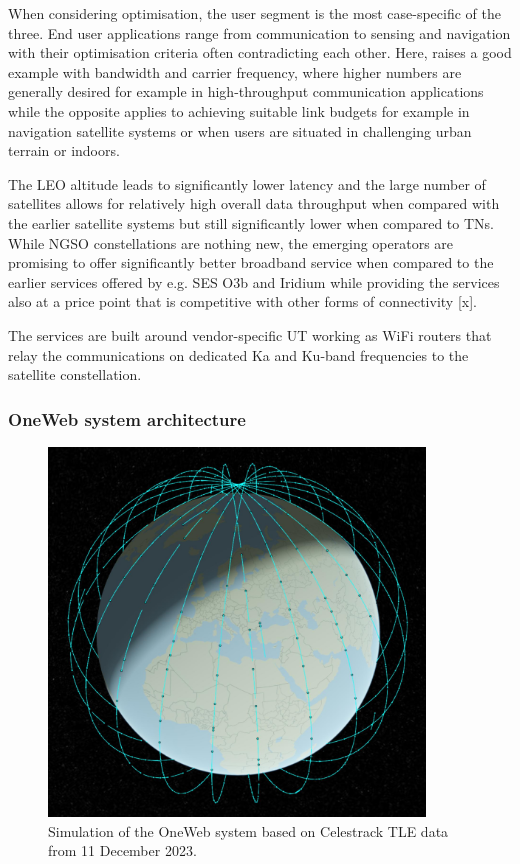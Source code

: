 \documentclass[english, 12pt, a4paper, elec, utf8, a-1b, online]{aaltothesis}
\begin{document}
When considering optimisation, the user segment is the most case-specific of the three.
End user applications range from communication to sensing and navigation with their optimisation criteria often contradicting each other.
Here, \cite{celikbilek2022survey} raises a good example with bandwidth and carrier frequency, where higher numbers are generally desired for example in high-throughput communication applications while the opposite applies to achieving suitable link budgets for example in navigation satellite systems or when users are situated in challenging urban terrain or indoors.

The LEO altitude leads to significantly lower latency and the large number of satellites allows for relatively high overall data throughput when compared with the earlier satellite systems but still significantly lower when compared to TNs.
While NGSO constellations are nothing new, the emerging operators are promising to offer significantly better broadband service when compared to the earlier services offered by e.g. SES O3b and Iridium while providing the services also at a price point that is competitive with other forms of connectivity [x]. %

The services are built around vendor-specific UT working as WiFi routers that relay the communications on dedicated Ka and Ku-band frequencies to the satellite constellation. %

\subsubsection{OneWeb system architecture} \label{ch-oneweb}

\begin{figure}[h]
  \centering
  \includegraphics[width=100mm]{figures/oneweb-tle-2023-12-11-compressed.jpg}
  \caption{Simulation of the OneWeb system based on Celestrack TLE data from 11 December 2023.}
  \label{fig-oneweb-tle-2023-12-11}
\end{figure}
\end{document}
